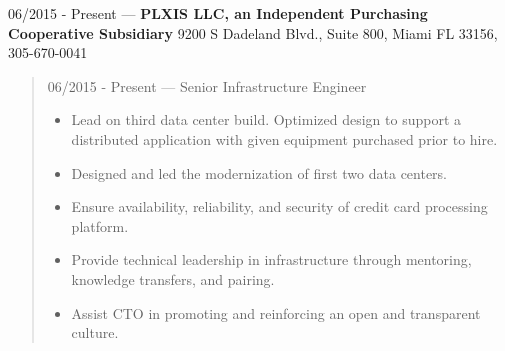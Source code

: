 06/2015 - Present --- {\bf PLXIS LLC, an Independent Purchasing Cooperative Subsidiary} 9200 S Dadeland Blvd., Suite 800, Miami FL 33156, 305-670-0041
\begin{quote}
06/2015 - Present --- Senior Infrastructure Engineer
\begin{itemize}
\item Lead on third data center build.  Optimized design to support a distributed application with given equipment purchased prior to hire.
\item Designed and led the modernization of first two data centers.
\item Ensure availability, reliability, and security of credit card processing platform.
\item Provide technical leadership in infrastructure through mentoring, knowledge transfers, and pairing.
\item Assist CTO in promoting and reinforcing an open and transparent culture.
\end{itemize}
\end{quote}
